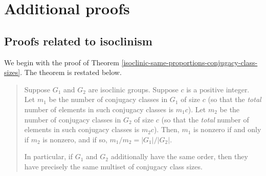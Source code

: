\section{Additional proofs}

\subsection{Proofs related to isoclinism}\label{appsec:isoclinism-extra-proofs}

We begin with the proof of Theorem
\ref{isoclinic-same-proportions-conjugacy-class-sizes}. The theorem is
restated below.

\begin{quote}
  Suppose $G_1$ and $G_2$ are isoclinic groups. Suppose $c$ is a
  positive integer. Let $m_1$ be the number of conjugacy classes in
  $G_1$ of size $c$ (so that the {\em total} number of elements in
  such conjugacy classes is $m_1c$). Let $m_2$ be the number of
  conjugacy classes in $G_2$ of size $c$ (so that the {\em total}
  number of elements in such conjugacy classes is $m_2c$). Then, $m_1$
  is nonzero if and only if $m_2$ is nonzero, and if so, $m_1/m_2 =
  |G_1|/|G_2|$.

  In particular, if $G_1$ and $G_2$ additionally have the same order,
  then they have precisely the same multiset of conjugacy class sizes.

\end{quote}

